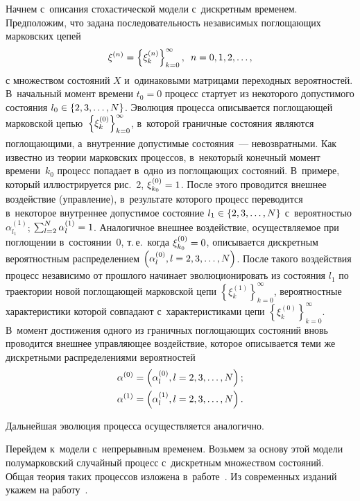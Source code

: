 \begin{multicols}{2}
Начнем с~описания стохастической модели с~дискретным временем.
Предположим, что задана последовательность независимых поглощающих марковских 
цепей
$$
\xi^{(n)}=\left\{\xi_{k}^{(n)}\right\}_{k=0}^{\infty},\enskip n=0,1,2,\dots,
$$
с множеством состояний $X$ и~одинаковыми матрицами переходных вероятностей.
В~начальный момент времени $t_{0}=0$ процесс стартует из некоторого допустимого 
состояния
$l_0\hm\in\lbrace 2,3,\ldots ,N\rbrace $. Эволюция процесса описывается
поглощающей марковской цепью $\vphantom{\int\limits_{m}}\left\{ \xi _{k}^{(0)}\right\}^{\infty}_{k=0}$, 
в~которой граничные состояния являются поглощающими, а~внут\-рен\-ние
до\-пус\-ти\-мые состояния~--- невозвратными. Как известно из тео\-рии марковских
процессов, в~некоторый конечный момент времени~$k_{0}$
процесс попадает в~одно из по\-гло\-ща\-ющих со\-сто\-яний. В~примере, который 
иллюстрируется рис.~2, $\xi_{k_0}^{(0)}\hm=1$. 
После этого проводится внешнее воздействие
(управ\-ле\-ние), в~результате которого процесс переводится в~некоторое
внутреннее допустимое состояние $l_1\hm\in\lbrace 2,3,\ldots ,N\rbrace $ с~вероятностью $\alpha _{l_1}^{(1)}$; 
$\sum\nolimits_{l=2}^{N}{\alpha_{l}^{(1)}}\hm=1$. 
Аналогичное внешнее воздействие, осуществ\-ля\-емое при
поглощении в~со\-сто\-янии~0, т.\,е.\ когда $\xi _{k_0}^{(0)}\hm=0$,
описывается дискретным вероятностным распределением $\left( \alpha_{l}^{(0)}, 
l\hm=2,3,\ldots ,N\right) $. После такого воздействия
процесс независимо от прошлого начинает эволюционировать из состояния $
l_1$ по траектории новой поглощающей марковской цепи $\left\{ \xi_{k}^{(1)}
\right\}_{k=0}^{\infty}$, вероятностные характеристики которой 
совпадают с~характеристиками цепи $\left\{ \xi _{k}^{(0)}\right\}_{k=0}^{\infty}$. 
В~момент
достижения одного из граничных погло\-щающих состояний вновь проводится
внешнее управляющее воздействие, которое описывается теми же дискретными
распределениями ве\-ро\-ят\-ностей 
\begin{align*}
\alpha^{(0)} &= \left( \alpha_{l}^{(0)},l\hm=
2,3,\ldots
,N\right);\\
\alpha^{(1)}&=\left( \alpha _{l}^{(1)},
 l\hm=2,3,\ldots ,N\right). 
 \end{align*}
 
Дальнейшая эволюция процесса осуществляется аналогично.

Перейдем к~модели с~непрерывным временем. Возьмем за основу этой модели 
полумарковский случайный процесс с~дискретным множеством состояний. Общая теория 
таких процессов изложена в~работе~\cite{KorolukTurbin}. Из современных изданий 
укажем на работу~\cite{JanssenManca}.


\end{multicols}
